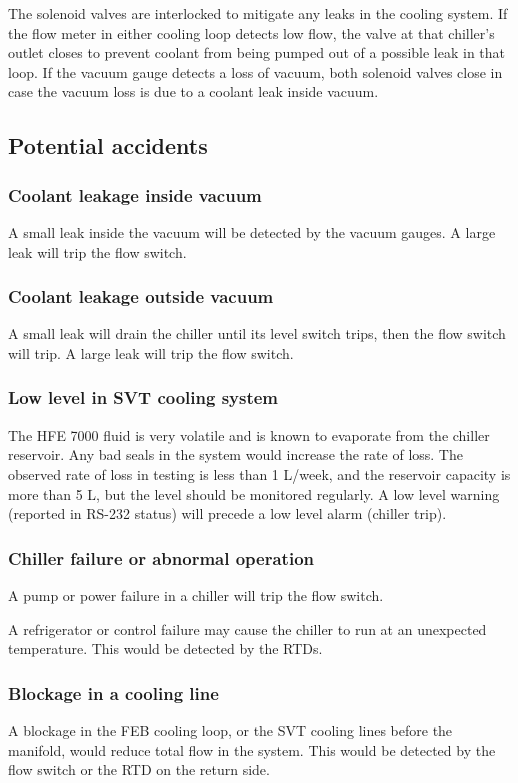 \documentclass[12pt]{report}
\begin{document}
The solenoid valves are interlocked to mitigate any leaks in the cooling system. 
If the flow meter in either cooling loop detects low flow, the valve at that chiller's outlet closes to prevent coolant from being pumped out of a possible leak in that loop. 
If the vacuum gauge detects a loss of vacuum, both solenoid valves close in case the vacuum loss is due to a coolant leak inside vacuum.

\subsection{Potential accidents}
\subsubsection*{Coolant leakage inside vacuum}
A small leak inside the vacuum will be detected by the vacuum gauges. A large leak will trip the flow switch.
\subsubsection*{Coolant leakage outside vacuum}
A small leak will drain the chiller until its level switch trips, then the flow switch will trip. A large leak will trip the flow switch.
\subsubsection*{Low level in SVT cooling system}
The HFE 7000 fluid is very volatile and is known to evaporate from the chiller reservoir. Any bad seals in the system would increase the rate of loss. The observed rate of loss in testing is less than 1 L/week, and the reservoir capacity is more than 5 L, but the level should be monitored regularly. A low level warning (reported in RS-232 status) will precede a low level alarm (chiller trip).
\subsubsection*{Chiller failure or abnormal operation}
A pump or power failure in a chiller will trip the flow switch.

A refrigerator or control failure may cause the chiller to run at an unexpected temperature. This would be detected by the RTDs.
\subsubsection*{Blockage in a cooling line}
A blockage in the FEB cooling loop, or the SVT cooling lines before the manifold, would reduce total flow in the system. This would be detected by the flow switch or the RTD on the return side.
\end{document}
